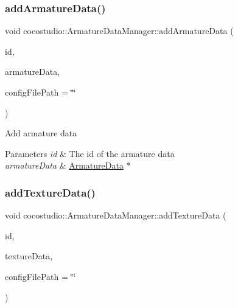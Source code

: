 \subsubsection{\texorpdfstring{add\+Armature\+Data()}{addArmatureData()}\hspace{0.1cm}{\footnotesize\ttfamily [2/2]}}
{\footnotesize\ttfamily void cocostudio\+::\+Armature\+Data\+Manager\+::add\+Armature\+Data (\begin{DoxyParamCaption}\item[{const std\+::string \&}]{id,  }\item[{\hyperlink{classcocostudio_1_1ArmatureData}{Armature\+Data} $\ast$}]{armature\+Data,  }\item[{const std\+::string \&}]{config\+File\+Path = {\ttfamily \char`\"{}\char`\"{}} }\end{DoxyParamCaption})}

Add armature data 
\begin{DoxyParams}{Parameters}
{\em id} & The id of the armature data \\
\hline
{\em armature\+Data} & \hyperlink{classcocostudio_1_1ArmatureData}{Armature\+Data} $\ast$ \\
\hline
\end{DoxyParams}
\mbox{\label{classcocostudio_1_1ArmatureDataManager_aed885f4d9ab821f83f3a3826655e3325}} 
\subsubsection{\texorpdfstring{add\+Texture\+Data()}{addTextureData()}\hspace{0.1cm}{\footnotesize\ttfamily [1/2]}}
{\footnotesize\ttfamily void cocostudio\+::\+Armature\+Data\+Manager\+::add\+Texture\+Data (\begin{DoxyParamCaption}\item[{const std\+::string \&}]{id,  }\item[{\hyperlink{classcocostudio_1_1TextureData}{Texture\+Data} $\ast$}]{texture\+Data,  }\item[{const std\+::string \&}]{config\+File\+Path = {\ttfamily \char`\"{}\char`\"{}} }\end{DoxyParamCaption})}



